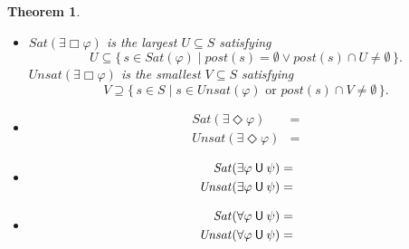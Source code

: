 \documentclass[12pt]{article}
\newcommand{\always}{\Box}
\newcommand{\eventually}{\Diamond}
\newcommand{\nxt}{\bigcirc}
\newcommand{\until}{\mathbin{\sf U}}
\newtheorem{theorem}{Theorem}
\theoremstyle{definition}
\begin{document}
\begin{theorem}
\begin{itemize}
\begin{align*}
\end{align*}
\item
$\mathit{Sat}(\exists \always \varphi)$ is the largest $U \subseteq S$ satisfying
\[
U \subseteq \{\, s \in \mathit{Sat}(\varphi) \mid \mathit{post}(s) = \emptyset \vee \mathit{post}(s) \cap U \not= \emptyset \,\}.
\]
$\mathit{Unsat}(\exists \always \varphi)$ is the smallest $V \subseteq S$ satisfying
\[
V \supseteq 
\{\, s \in S \mid s \in \mathit{Unsat}(\varphi) \mbox{ or } \mathit{post}(s) \cap V \not= \emptyset \,\}.
\]
\item
\begin{align*}
\mathit{Sat}(\exists \eventually \varphi) & = \\
\mathit{Unsat}(\exists \eventually \varphi) & = 
\end{align*}
\item
\begin{align*}
\mathit{Sat}(\exists \varphi \until \psi) & = \\
\mathit{Unsat}(\exists \varphi \until \psi) & = 
\end{align*}
\item
\begin{align*}
\mathit{Sat}(\forall \varphi \until \psi) & = \\
\mathit{Unsat}(\forall \varphi \until \psi) & = 
\end{align*}
\end{itemize}
\end{theorem}
\end{document}
